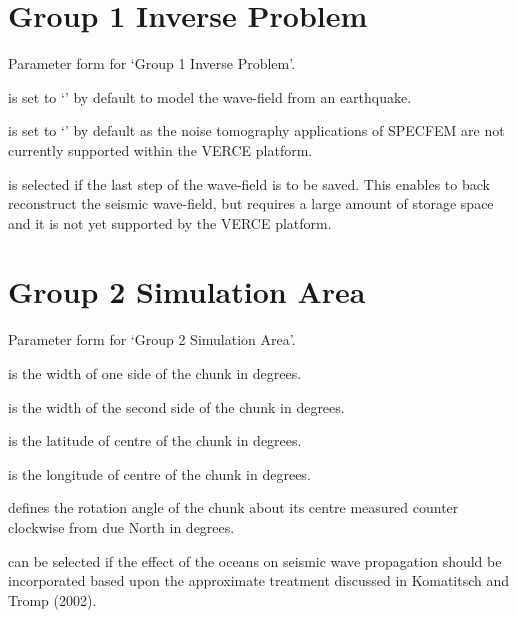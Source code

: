 \documentclass[english]{book}
\begin{document}
\section{Group 1 \textendash{} Inverse Problem}
\label{\detokenize{Appendix2:a2-2-group-1-inverse-problem}}

 Parameter form for ‘Group 1 \textendash{} Inverse Problem’.

 is set to ‘’ by default to model the
wave-field from an earthquake.

 is set to ‘’ by default
as the noise tomography applications of SPECFEM are not currently
supported within the VERCE platform.

 is selected if the last step of the wave-field is to
be saved. This enables to back reconstruct the seismic wave-field, but
requires a large amount of storage space and it is not yet supported by
the VERCE platform.


\section{Group 2 \textendash{} Simulation Area}
\label{\detokenize{Appendix2:a2-3-group-2-simulation-area}}

 Parameter form for ‘Group 2 \textendash{} Simulation Area’.

 is the width of one side of the
chunk in degrees.

 is the width of the second side of
the chunk in degrees.

 is the latitude of centre of the chunk
in degrees.

 is the longitude of centre of the
chunk in degrees.

 defines the rotation angle of the chunk
about its centre measured counter clockwise from due North in degrees.

 can be selected if the effect of the oceans on seismic wave
propagation should be incorporated based upon the approximate treatment
discussed in Komatitsch and Tromp (2002).
\end{document}
